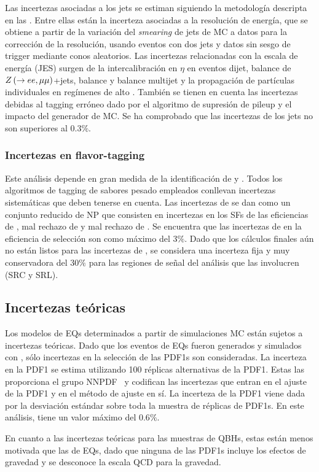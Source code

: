 Las incertezas asociadas a los jets se estiman siguiendo la metodología descripta en las .
Entre ellas están la incerteza asociadas a la resolución de energía, que se obtiene a partir de la variación del \textit{smearing} de jets de \ac{MC} a datos para la corrección de la resolución, usando eventos con dos jets y datos sin sesgo de trigger mediante conos aleatorios.
Las incertezas relacionadas con la escala de energía (JES) surgen de la intercalibración en \(\eta\) en eventos dijet, balance de \(Z\left(\rightarrow ee, \mu\mu\right)\)+jets, balance \gammajet y balance multijet y la propagación de partículas individuales en regímenes de alto \pt.
También se tienen en cuenta las incertezas debidas al tagging erróneo dado por el algoritmo de supresión de pileup y el impacto del generador de \ac{MC}.
Se ha comprobado que las incertezas de los jets no son superiores al \(0.3\%\).









\subsubsection{Incertezas en flavor-tagging}

Este análisis depende en gran medida de la identificación de \bjets y \cjets. Todos los algoritmos de tagging de sabores pesado empleados conllevan incertezas sistemáticas que deben tenerse en cuenta. Las incertezas de \btagging se dan como un conjunto reducido de \ac{NP} que consisten en incertezas en los \acp{SF} de las eficiencias de \btagging, mal rechazo de \cjet y mal rechazo de \ljet. Se encuentra que las incertezas de \btagging en la eficiencia de selección son como máximo del \(3\%\). Dado que los cálculos finales aún no están listos para las incertezas de \ctagging, se considera una incerteza fija y muy conservadora del \(30\%\) para las regiones de señal del análisis que las involucren (SRC y SRL).








\subsection{Incertezas teóricas}
\label{subsec:signals:systs:theo}

Los modelos de \acp{EQ} determinados a partir de simulaciones \ac{MC} están sujetos a incertezas teóricas. 
Dado que los eventos de \acp{EQ} fueron generados y simulados con \Pythia, sólo incertezas en la selección de las \acp{PDF1} son consideradas.
La incerteza en la \ac{PDF1} se estima utilizando 100 réplicas alternativas de la \ac{PDF1}. Estas las proporciona el grupo NNPDF~\cite{NNPDF2} y codifican las incertezas que entran en el ajuste de la \ac{PDF1} y en el método de ajuste en sí. La incerteza de la \ac{PDF1} viene dada por la desviación estándar sobre toda la muestra de réplicas de \acp{PDF1}. En este análisis, tiene un valor máximo del \(0.6\%\).

En cuanto a las incertezas teóricas para las muestras de \acp{QBH}, estas están menos motivada que las de \acp{EQ}, dado que ninguna de las \acp{PDF1} incluye los efectos de gravedad y se desconoce la escala \ac{QCD} para la gravedad.